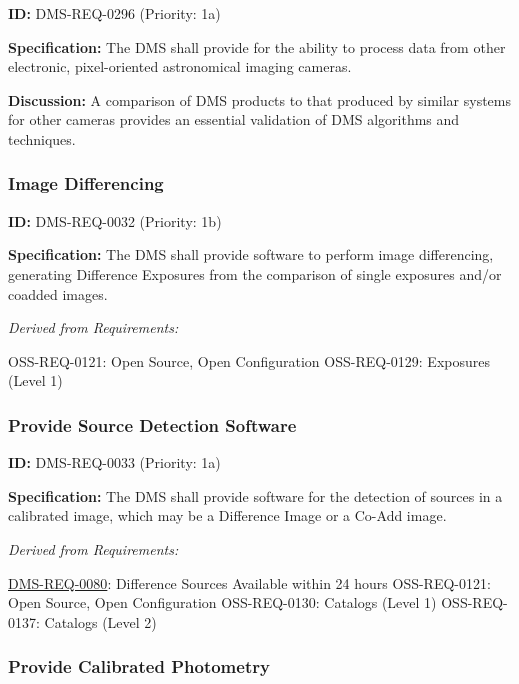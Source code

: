 \documentclass[SE,toc,lsstdraft]{lsstdoc}
\begin{document}
\label{DMS-REQ-0296}
\textbf{ID:} DMS-REQ-0296 (Priority: 1a)

\textbf{Specification:} The DMS shall provide for the ability to process data from other electronic, pixel-oriented astronomical imaging cameras.

\textbf{Discussion: }A comparison of DMS products to that produced by similar systems for other cameras provides an essential validation of DMS algorithms and techniques.

\subsubsection{Image Differencing}

\label{DMS-REQ-0032}
\textbf{ID:} DMS-REQ-0032 (Priority: 1b)

\textbf{Specification:} The DMS shall provide software to perform image differencing, generating Difference Exposures from the comparison of single exposures and/or coadded images.

\emph{Derived from Requirements:}

OSS-REQ-0121:
Open Source, Open Configuration \newline
OSS-REQ-0129:
Exposures (Level 1) \newline

\subsubsection{Provide Source Detection Software}

\label{DMS-REQ-0033}
\textbf{ID:} DMS-REQ-0033 (Priority: 1a)

\textbf{Specification:} The DMS shall provide software for the detection of sources in a calibrated image, which may be a Difference Image or a Co-Add image.

\emph{Derived from Requirements:}

\hyperref[DMS-REQ-0080]{DMS-REQ-0080}:
Difference Sources Available within 24 hours \newline
OSS-REQ-0121:
Open Source, Open Configuration \newline
OSS-REQ-0130:
Catalogs (Level 1) \newline
OSS-REQ-0137:
Catalogs (Level 2) \newline

\subsubsection{Provide Calibrated Photometry}
\end{document}
